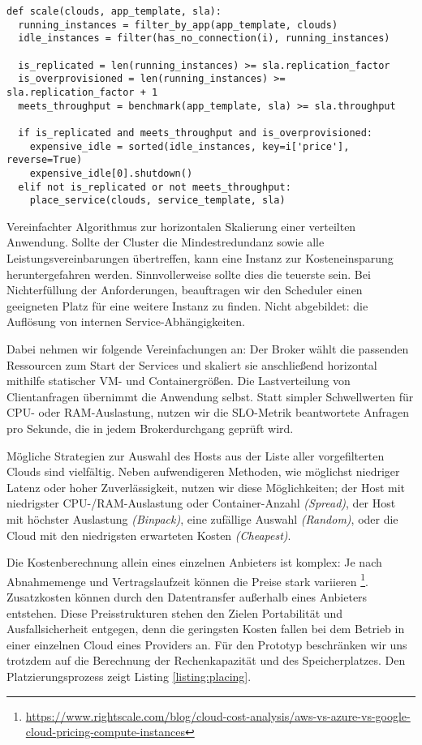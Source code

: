 \begin{listing}[ht]
\begin{verbatim}
def scale(clouds, app_template, sla):
  running_instances = filter_by_app(app_template, clouds)
  idle_instances = filter(has_no_connection(i), running_instances)
	
  is_replicated = len(running_instances) >= sla.replication_factor
  is_overprovisioned = len(running_instances) >= sla.replication_factor + 1
  meets_throughput = benchmark(app_template, sla) >= sla.throughput

  if is_replicated and meets_throughput and is_overprovisioned:
    expensive_idle = sorted(idle_instances, key=i['price'], reverse=True)
    expensive_idle[0].shutdown()
  elif not is_replicated or not meets_throughput:
    place_service(clouds, service_template, sla)
\end{verbatim}
\caption{Vereinfachter Algorithmus zur horizontalen Skalierung einer verteilten Anwendung. Sollte der Cluster die Mindestredundanz sowie alle Leistungsvereinbarungen übertreffen, kann eine Instanz zur Kosteneinsparung heruntergefahren werden. Sinnvollerweise sollte dies die teuerste sein. Bei Nichterfüllung der Anforderungen, beauftragen wir den Scheduler einen geeigneten Platz für eine weitere Instanz zu finden. Nicht abgebildet: die Auflösung von internen Service-Abhängigkeiten.}
\label{listing:scaling}
\end{listing}

Dabei nehmen wir folgende Vereinfachungen an: Der Broker wählt die passenden Ressourcen zum Start der Services und skaliert sie anschließend horizontal mithilfe statischer VM- und Containergrößen. Die Lastverteilung von Clientanfragen übernimmt die Anwendung selbst. Statt simpler Schwellwerten für CPU- oder RAM-Auslastung, nutzen wir die SLO-Metrik beantwortete Anfragen pro Sekunde, die in jedem Brokerdurchgang geprüft wird.

Mögliche Strategien zur Auswahl des Hosts aus der Liste aller vorgefilterten Clouds sind vielfältig. Neben aufwendigeren Methoden, wie möglichst niedriger Latenz oder hoher Zuverlässigkeit, nutzen wir diese Möglichkeiten; der Host mit niedrigster CPU-/RAM-Auslastung oder Container-Anzahl \emph{(Spread)}, der Host mit höchster Auslastung \emph{(Binpack)}, eine zufällige Auswahl \emph{(Random)}, oder die Cloud mit den niedrigsten erwarteten Kosten \emph{(Cheapest)}.

Die Kostenberechnung allein eines einzelnen Anbieters ist komplex: Je nach Abnahmemenge und Vertragslaufzeit können die Preise stark variieren \footnote{\url{https://www.rightscale.com/blog/cloud-cost-analysis/aws-vs-azure-vs-google-cloud-pricing-compute-instances}}. Zusatzkosten können durch den Datentransfer außerhalb eines Anbieters entstehen. Diese Preisstrukturen stehen den Zielen Portabilität und Ausfallsicherheit entgegen, denn die geringsten Kosten fallen bei dem Betrieb in einer einzelnen Cloud eines Providers an. Für den Prototyp beschränken wir uns trotzdem auf die Berechnung der Rechenkapazität und des Speicherplatzes. Den Platzierungsprozess zeigt Listing \autoref{listing:placing}.

